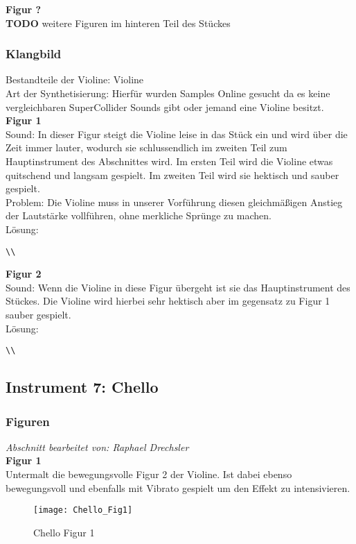 \documentclass[
10pt, %
a4paper, %
oneside, %
headinclude,footinclude, %
BCOR5mm, %
]{scrartcl}
\begin{document}
\noindent\textbf{Figur ?}\\
{\color{red}\textbf{TODO}} weitere Figuren im hinteren Teil des Stückes

\subsubsection{Klangbild}
Bestandteile der Violine: Violine\\
Art der Synthetisierung: Hierfür wurden Samples Online gesucht da es keine vergleichbaren SuperCollider Sounds gibt oder jemand eine Violine besitzt.\\
\noindent\textbf{Figur 1}\\
Sound: In dieser Figur steigt die Violine leise in das Stück ein und wird über die Zeit immer lauter, wodurch sie schlussendlich im zweiten Teil 
zum Hauptinstrument des Abschnittes wird. Im ersten Teil wird die Violine etwas quitschend und langsam gespielt. Im zweiten Teil wird sie hektisch und sauber gespielt.\\
Problem: Die Violine muss in unserer Vorführung diesen gleichmäßigen Anstieg der Lautstärke vollführen, ohne merkliche Sprünge zu machen.\\
Lösung:\\
\begin{lstlisting}
\\
\end{lstlisting}
\noindent\textbf{Figur 2}\\
Sound: Wenn die Violine in diese Figur übergeht ist sie das Hauptinstrument des Stückes. Die Violine wird hierbei sehr hektisch aber im gegensatz zu Figur 1 sauber gespielt.\\
Lösung:\\
\begin{lstlisting}
\\
\end{lstlisting}



\subsection{Instrument 7: Chello}
\subsubsection{Figuren}
\textit{Abschnitt bearbeitet von: Raphael Drechsler}\\

\noindent\textbf{Figur 1}\\
Untermalt die bewegungsvolle Figur 2 der Violine. Ist dabei ebenso bewegungsvoll und ebenfalls mit Vibrato gespielt um den Effekt zu intensivieren.
\begin{figure}[h]
	\centering 
	\texttt{[image: Chello\_Fig1]} 
	\caption{Chello Figur 1}
\end{figure}
\end{document}
